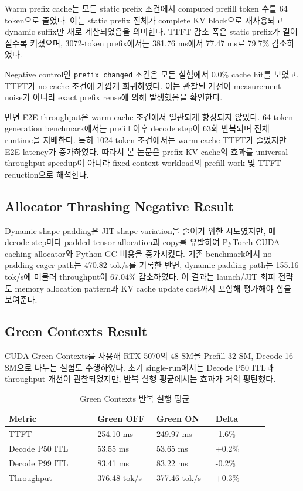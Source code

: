 \documentclass{kcc}
\begin{document}
Warm prefix cache는 모든 static prefix 조건에서 computed prefill token 수를 64 token으로 줄였다. 이는 static prefix 전체가 complete KV block으로 재사용되고 dynamic suffix만 새로 계산되었음을 의미한다. TTFT 감소 폭은 static prefix가 길어질수록 커졌으며, 3072-token prefix에서는 381.76 ms에서 77.47 ms로 79.7\% 감소하였다.

Negative control인 \texttt{prefix\_changed} 조건은 모든 실험에서 0.0\% cache hit를 보였고, TTFT가 no-cache 조건에 가깝게 회귀하였다. 이는 관찰된 개선이 measurement noise가 아니라 exact prefix reuse에 의해 발생했음을 확인한다.

반면 E2E throughput은 warm-cache 조건에서 일관되게 향상되지 않았다. 64-token generation benchmark에서는 prefill 이후 decode step이 63회 반복되며 전체 runtime을 지배한다. 특히 1024-token 조건에서는 warm-cache TTFT가 줄었지만 E2E latency가 증가하였다. 따라서 본 논문은 prefix KV cache의 효과를 universal throughput speedup이 아니라 fixed-context workload의 prefill work 및 TTFT reduction으로 해석한다.

\subsection{Allocator Thrashing Negative Result}
Dynamic shape padding은 JIT shape variation을 줄이기 위한 시도였지만, 매 decode step마다 padded tensor allocation과 copy를 유발하여 PyTorch CUDA caching allocator와 Python GC 비용을 증가시켰다. 기존 benchmark에서 no-padding eager path는 470.82 tok/s를 기록한 반면, dynamic padding path는 155.16 tok/s에 머물러 throughput이 67.04\% 감소하였다. 이 결과는 launch/JIT 회피 전략도 memory allocation pattern과 KV cache update cost까지 포함해 평가해야 함을 보여준다.

\subsection{Green Contexts Result}
CUDA Green Contexts를 사용해 RTX 5070의 48 SM을 Prefill 32 SM, Decode 16 SM으로 나누는 실험도 수행하였다. 초기 single-run에서는 Decode P50 ITL과 throughput 개선이 관찰되었지만, 반복 실행 평균에서는 효과가 거의 평탄했다.

\begin{table}[h]
\centering
\scriptsize
\setlength{\tabcolsep}{2pt}
\begin{tabular}{|p{0.30\linewidth}|p{0.20\linewidth}|p{0.20\linewidth}|p{0.18\linewidth}|}
\hline
\textbf{Metric} & \textbf{Green OFF} & \textbf{Green ON} & \textbf{Delta} \\ \hline
TTFT & 254.10 ms & 249.97 ms & -1.6\% \\ \hline
Decode P50 ITL & 53.55 ms & 53.65 ms & +0.2\% \\ \hline
Decode P99 ITL & 83.41 ms & 83.22 ms & -0.2\% \\ \hline
Throughput & 376.48 tok/s & 377.46 tok/s & +0.3\% \\ \hline
\end{tabular}
\caption{Green Contexts 반복 실행 평균}
\end{table}
\end{document}
